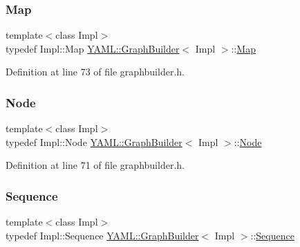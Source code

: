 \subsubsection{\texorpdfstring{Map}{Map}}
{\footnotesize\ttfamily template$<$class Impl$>$ \\
typedef Impl\+::\+Map \mbox{\hyperlink{class_y_a_m_l_1_1_graph_builder}{Y\+A\+M\+L\+::\+Graph\+Builder}}$<$ Impl $>$\+::\mbox{\hyperlink{class_y_a_m_l_1_1_graph_builder_af58f15b2d877d52cc93fd1d28a754207}{Map}}}



Definition at line 73 of file graphbuilder.\+h.

\mbox{\label{class_y_a_m_l_1_1_graph_builder_a6d71230d66f879007be4581d5a7c9c85}} 
\subsubsection{\texorpdfstring{Node}{Node}}
{\footnotesize\ttfamily template$<$class Impl$>$ \\
typedef Impl\+::\+Node \mbox{\hyperlink{class_y_a_m_l_1_1_graph_builder}{Y\+A\+M\+L\+::\+Graph\+Builder}}$<$ Impl $>$\+::\mbox{\hyperlink{class_y_a_m_l_1_1_graph_builder_a6d71230d66f879007be4581d5a7c9c85}{Node}}}



Definition at line 71 of file graphbuilder.\+h.

\mbox{\label{class_y_a_m_l_1_1_graph_builder_ad0fae4935660f3c70c1b7b5a56e97d8a}} 
\subsubsection{\texorpdfstring{Sequence}{Sequence}}
{\footnotesize\ttfamily template$<$class Impl$>$ \\
typedef Impl\+::\+Sequence \mbox{\hyperlink{class_y_a_m_l_1_1_graph_builder}{Y\+A\+M\+L\+::\+Graph\+Builder}}$<$ Impl $>$\+::\mbox{\hyperlink{class_y_a_m_l_1_1_graph_builder_ad0fae4935660f3c70c1b7b5a56e97d8a}{Sequence}}}




